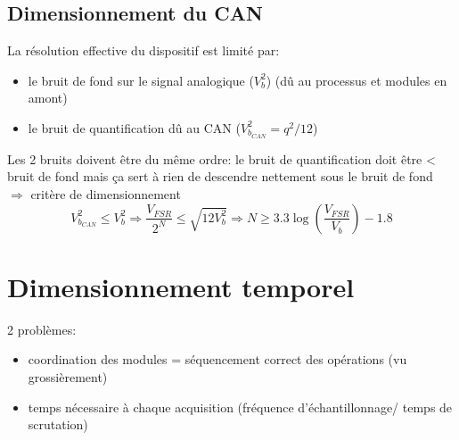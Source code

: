 \subsection{Dimensionnement du CAN}
La résolution effective du dispositif est limité par:
\begin{itemize}
	\item le bruit de fond sur le signal analogique (\(V_b^2\)) (dû au processus et modules en amont)
	\item le bruit de quantification dû au CAN (\(V_{b_{CAN}}^2=q^2/12\))
\end{itemize}
Les 2 bruits doivent être du même ordre: le bruit de quantification doit être < bruit de fond mais ça sert à rien de descendre nettement sous le bruit de fond \(\Rightarrow\) critère de dimensionnement
\[V_{b_{CAN}}^2\leq V_b^2\Rightarrow \frac{V_{FSR}}{2^N}\leq\sqrt{12V_b^2}\Rightarrow N\geq\num{3.3}\log\!\left(\frac{V_{FSR}}{V_b}\right)-\num{1.8}\]
\section{Dimensionnement temporel}
2 problèmes:
\begin{itemize}
	\item coordination des modules = séquencement correct des opérations (vu grossièrement)
	\item temps nécessaire à chaque acquisition (fréquence d'échantillonnage/ temps de scrutation)	
\end{itemize}
